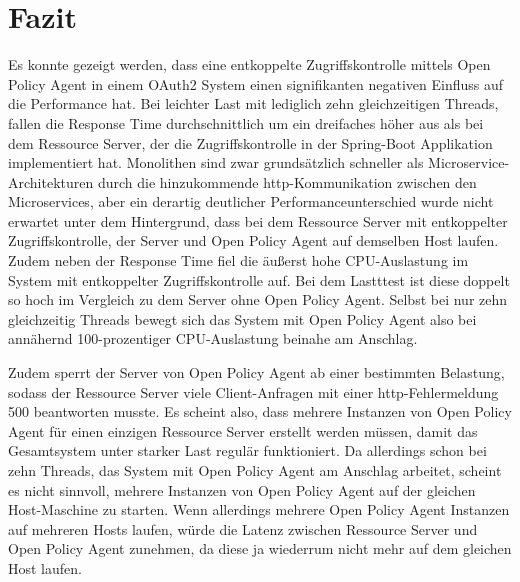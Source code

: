 \section{Fazit}
Es konnte gezeigt werden, dass eine entkoppelte Zugriffskontrolle mittels Open Policy Agent in einem OAuth2 System einen signifikanten negativen Einfluss auf die Performance hat. Bei leichter Last mit lediglich zehn gleichzeitigen Threads, fallen die Response Time durchschnittlich um ein dreifaches höher aus als bei dem Ressource Server, der die Zugriffskontrolle in der Spring-Boot Applikation implementiert hat. Monolithen sind zwar grundsätzlich schneller als Microservice-Architekturen durch die hinzukommende http-Kommunikation zwischen den Microservices, aber ein derartig deutlicher Performanceunterschied wurde nicht erwartet unter dem Hintergrund, dass bei dem Ressource Server mit entkoppelter Zugriffskontrolle, der Server und Open Policy Agent auf demselben Host laufen. Zudem neben der Response Time fiel die äußerst hohe CPU-Auslastung im System mit entkoppelter Zugriffskontrolle auf. Bei dem Lastttest ist diese doppelt so hoch im Vergleich zu dem Server ohne Open Policy Agent. Selbst bei nur zehn gleichzeitig Threads bewegt sich das System mit Open Policy Agent also bei annähernd 100-prozentiger CPU-Auslastung beinahe am Anschlag.\smallskip

Zudem sperrt der Server von Open Policy Agent ab einer bestimmten Belastung, sodass der Ressource Server viele Client-Anfragen mit einer http-Fehlermeldung 500 beantworten musste. Es scheint also, dass mehrere Instanzen von Open Policy Agent für einen einzigen Ressource Server erstellt werden müssen, damit das Gesamtsystem unter starker Last regulär funktioniert. Da allerdings schon bei zehn Threads, das System mit Open Policy Agent am Anschlag arbeitet, scheint es nicht sinnvoll, mehrere Instanzen von Open Policy Agent auf der gleichen Host-Maschine zu starten. Wenn allerdings mehrere Open Policy Agent Instanzen auf mehreren Hosts laufen, würde die Latenz zwischen Ressource Server und Open Policy Agent zunehmen, da diese ja wiederrum nicht mehr auf dem gleichen Host laufen. 
